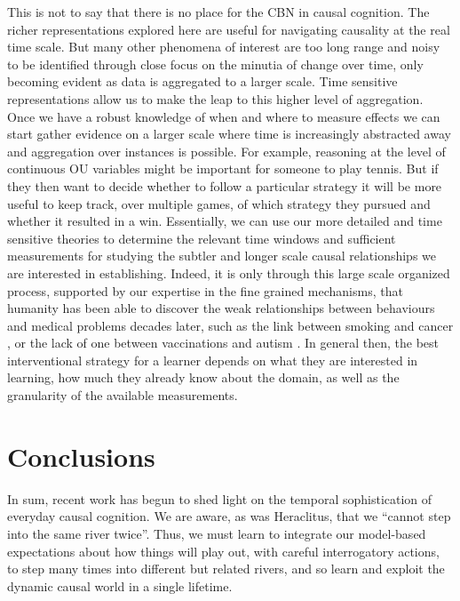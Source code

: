 \documentclass{cambridge7A}%
\begin{document}
This is not to say that there is no place for the CBN in causal cognition.  
The richer representations explored here are useful for navigating causality at the real time scale.  But many other phenomena of interest are too long range and noisy to be identified through close focus on the minutia of change over time, only becoming evident as data is aggregated to a larger scale.  Time sensitive representations allow us to make the leap to this higher level of aggregation.  Once we have a robust knowledge of when and where to measure effects we can start gather evidence on a larger scale where time is increasingly abstracted away and aggregation over instances is possible.  For example, reasoning at the level of continuous OU variables might be important for someone to play tennis. But if they then want to decide whether to follow a particular strategy it will be more useful to keep track, over multiple games, of which strategy they pursued and whether it resulted in a win.  Essentially, we can use our more detailed and time sensitive theories to determine the relevant time windows and sufficient measurements for studying the subtler and longer scale causal relationships we are interested in establishing.  Indeed, it is only through this large scale organized process, supported by our expertise in the fine grained mechanisms, that humanity has been able to discover the weak relationships between behaviours and medical problems decades later, such as the link between smoking and cancer \citep{gandini2008tobacco}, or the lack of one between vaccinations and autism \citep{verschuur1996hidden}.  In general then, the best interventional strategy for a learner depends on what they are interested in learning, how much they already know about the domain, as well as the granularity of the available measurements.

\section{Conclusions}

In sum, recent work has begun to shed light on the temporal sophistication of everyday causal cognition.  We are aware, as was Heraclitus, that we ``cannot step into the same river twice''\citep{barnes2013presocratics}.  Thus, we must learn to integrate our model-based expectations about how things will play out, with careful interrogatory actions, to step many times into different but related rivers, and so learn and exploit the dynamic causal world in a single lifetime.

\clearpage


\end{document}

